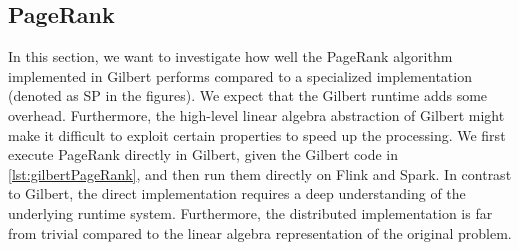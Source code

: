




\subsection{PageRank}

In this section, we want to investigate how well the PageRank algorithm~\cite{page:1999a} implemented in Gilbert performs compared to a specialized implementation (denoted as SP in the figures).
We expect that the Gilbert runtime adds some overhead.
Furthermore, the high-level linear algebra abstraction of Gilbert might make it difficult to exploit certain properties to speed up the processing.
We first execute PageRank directly in Gilbert, given the Gilbert code in \cref{lst:gilbertPageRank}, and then run them directly on Flink and Spark.
In contrast to Gilbert, the direct implementation requires a deep understanding of the underlying runtime system.
Furthermore, the distributed implementation is far from trivial compared to the linear algebra representation of the original problem.

